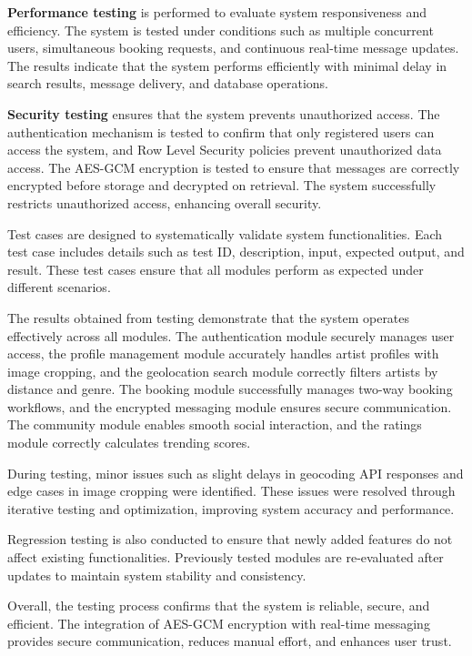 \documentclass[12pt,a4paper]{report}
\begin{document}
\textbf{Performance testing} is performed to evaluate system responsiveness and efficiency. The system is tested under conditions such as multiple concurrent users, simultaneous booking requests, and continuous real-time message updates. The results indicate that the system performs efficiently with minimal delay in search results, message delivery, and database operations.

\textbf{Security testing} ensures that the system prevents unauthorized access. The authentication mechanism is tested to confirm that only registered users can access the system, and Row Level Security policies prevent unauthorized data access. The AES-GCM encryption is tested to ensure that messages are correctly encrypted before storage and decrypted on retrieval. The system successfully restricts unauthorized access, enhancing overall security.

Test cases are designed to systematically validate system functionalities. Each test case includes details such as test ID, description, input, expected output, and result. These test cases ensure that all modules perform as expected under different scenarios.

The results obtained from testing demonstrate that the system operates effectively across all modules. The authentication module securely manages user access, the profile management module accurately handles artist profiles with image cropping, and the geolocation search module correctly filters artists by distance and genre. The booking module successfully manages two-way booking workflows, and the encrypted messaging module ensures secure communication. The community module enables smooth social interaction, and the ratings module correctly calculates trending scores.

During testing, minor issues such as slight delays in geocoding API responses and edge cases in image cropping were identified. These issues were resolved through iterative testing and optimization, improving system accuracy and performance.

Regression testing is also conducted to ensure that newly added features do not affect existing functionalities. Previously tested modules are re-evaluated after updates to maintain system stability and consistency.

Overall, the testing process confirms that the system is reliable, secure, and efficient. The integration of AES-GCM encryption with real-time messaging provides secure communication, reduces manual effort, and enhances user trust.
\end{document}
